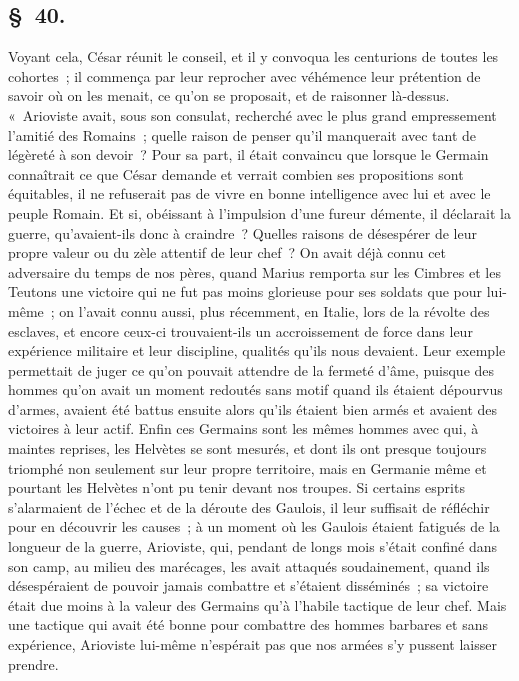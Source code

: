 \documentclass[french,twoside]{book} %
\begin{document}
\subsection[{§ 40.}]{ \textsc{§ 40.} }
\noindent Voyant cela, César réunit le conseil, et il y convoqua les centurions de toutes les cohortes ; il commença par leur reprocher avec véhémence leur prétention de savoir où on les menait, ce qu’on se proposait, et de raisonner là-dessus. « Arioviste avait, sous son consulat, recherché avec le plus grand empressement l’amitié des Romains ; quelle raison de penser qu’il manquerait avec tant de légèreté à son devoir ? Pour sa part, il était convaincu que lorsque le Germain connaîtrait ce que César demande et verrait combien ses propositions sont équitables, il ne refuserait pas de vivre en bonne intelligence avec lui et avec le peuple Romain. Et si, obéissant à l’impulsion d’une fureur démente, il déclarait la guerre, qu’avaient-ils donc à craindre ? Quelles raisons de désespérer de leur propre valeur ou du zèle attentif de leur chef ? On avait déjà connu cet adversaire du temps de nos pères, quand Marius remporta sur les Cimbres et les Teutons une victoire qui ne fut pas moins glorieuse pour ses soldats que pour lui-même ; on l’avait connu aussi, plus récemment, en Italie, lors de la révolte des esclaves, et encore ceux-ci trouvaient-ils un accroissement de force dans leur expérience militaire et leur discipline, qualités qu’ils nous devaient. Leur exemple permettait de juger ce qu’on pouvait attendre de la fermeté d’âme, puisque des hommes qu’on avait un moment redoutés sans motif quand ils étaient dépourvus d’armes, avaient été battus ensuite alors qu’ils étaient bien armés et avaient des victoires à leur actif. Enfin ces Germains sont les mêmes hommes avec qui, à maintes reprises, les Helvètes se sont mesurés, et dont ils ont presque toujours triomphé non seulement sur leur propre territoire, mais en Germanie même et pourtant les Helvètes n’ont pu tenir devant nos troupes. Si certains esprits s’alarmaient de l’échec et de la déroute des Gaulois, il leur suffisait de réfléchir pour en découvrir les causes ; à un moment où les Gaulois étaient fatigués de la longueur de la guerre, Arioviste, qui, pendant de longs mois s’était confiné dans son camp, au milieu des marécages, les avait attaqués soudainement, quand ils désespéraient de pouvoir jamais combattre et s’étaient disséminés ; sa victoire était due moins à la valeur des Germains qu’à l’habile tactique de leur chef. Mais une tactique qui avait été bonne pour combattre des hommes barbares et sans expérience, Arioviste lui-même n’espérait pas que nos armées s’y pussent laisser prendre.\par
\end{document}
